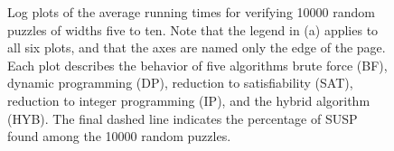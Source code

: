 \begin{figure}
  \vspace{-2ex}
  \caption{Log plots of the average running times for verifying 10000 random puzzles of widths
    five to ten. Note that the legend in (a) applies to all six plots,
    and that the axes are named only the edge of the page.  Each plot
    describes the behavior of five algorithms brute force (BF),
    dynamic programming (DP), reduction to satisfiability (SAT),
    reduction to integer programming (IP), and the hybrid algorithm
    (HYB).  The final dashed line indicates the percentage of SUSP
    found among the 10000 random puzzles.}
  \label{fig:perform}
\end{figure}
  
